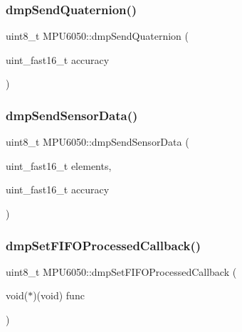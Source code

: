 \mbox{\label{classMPU6050_ac0f184549296f18d3f5a84a1a0e14be2}} 
\subsubsection{\texorpdfstring{dmpSendQuaternion()}{dmpSendQuaternion()}}
{\footnotesize\ttfamily uint8\+\_\+t M\+P\+U6050\+::dmp\+Send\+Quaternion (\begin{DoxyParamCaption}\item[{uint\+\_\+fast16\+\_\+t}]{accuracy }\end{DoxyParamCaption})}

\mbox{\label{classMPU6050_a8e34dafaffb307b410cb5411eda30d25}} 
\subsubsection{\texorpdfstring{dmpSendSensorData()}{dmpSendSensorData()}}
{\footnotesize\ttfamily uint8\+\_\+t M\+P\+U6050\+::dmp\+Send\+Sensor\+Data (\begin{DoxyParamCaption}\item[{uint\+\_\+fast16\+\_\+t}]{elements,  }\item[{uint\+\_\+fast16\+\_\+t}]{accuracy }\end{DoxyParamCaption})}

\mbox{\label{classMPU6050_a3dd7662a5e7ef6bfc017c1b6237960f8}} 
\subsubsection{\texorpdfstring{dmpSetFIFOProcessedCallback()}{dmpSetFIFOProcessedCallback()}}
{\footnotesize\ttfamily uint8\+\_\+t M\+P\+U6050\+::dmp\+Set\+F\+I\+F\+O\+Processed\+Callback (\begin{DoxyParamCaption}\item[{void($\ast$)(void)}]{func }\end{DoxyParamCaption})}

\mbox{\label{classMPU6050_a38853416eedf4074d15bc0ea4da47bd9}} 
